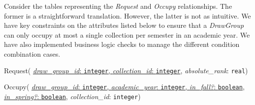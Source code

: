 Consider the tables representing the \emph{Request} and \emph{Occupy}
relationships. The former is a straightforward translation. However, the latter
is not as intuitive. We have key constraints on the attributes listed below to
ensure that a \emph{DrawGroup} can only occupy at most a single collection per
semester in an academic year. We have also implemented business logic checks to
manage the different condition combination cases.

\begin{description}
  \item Request(
        \ul{\emph{draw\_group\_id}: \texttt{integer},
        \emph{collection\_id}: \texttt{integer}},
        \emph{absolute\_rank}: \texttt{real})

  \item Occupy(
        \ul{\emph{draw\_group\_id}: \texttt{integer},
        \emph{academic\_year}: \texttt{integer},
        \emph{in\_fall?}: \texttt{boolean},
        \emph{in\_spring?}: \texttt{boolean}},
        \emph{collection\_id}: \texttt{integer})

\end{description}



